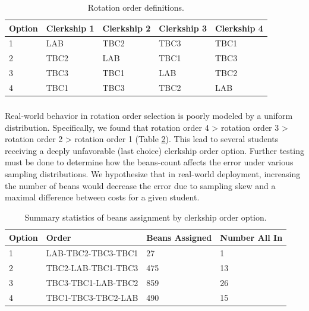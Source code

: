 \documentclass{article}
\begin{document}
\begin{table}[h]
\centering
\begin{tabular}{@{}lllll@{}}
\toprule
Option & Clerkship 1 & Clerkship 2 & Clerkship 3 & Clerkship 4 \\ \midrule
1      & LAB         & TBC2        & TBC3        & TBC1        \\
2      & TBC2        & LAB         & TBC1        & TBC3        \\
3      & TBC3        & TBC1        & LAB         & TBC2        \\
4      & TBC1        & TBC3        & TBC2        & LAB         \\ \bottomrule
\end{tabular}
\caption{Rotation order definitions.}
\label{tab:tab1}
\end{table}

\subsubsection{}
Real-world behavior in rotation order selection is poorly modeled by a uniform distribution. Specifically, we found that rotation order 4 > rotation order 3 > rotation order 2 > rotation order 1 (Table \ref{tab:tab2}). This lead to several students receiving a deeply unfavorable (last choice) clerkship order option. Further testing must be done to determine how the beans-count affects the error under various sampling distributions. We hypothesize that in real-world deployment, increasing the number of beans would decrease the error due to sampling skew and a maximal difference between costs for a given student. 

\begin{table}[h]
\centering
\begin{tabular}{@{}llll@{}}
\toprule
Option & Order              & Beans Assigned & Number All In \\ \midrule
1      & LAB-TBC2-TBC3-TBC1 & 27             & 1             \\
2      & TBC2-LAB-TBC1-TBC3 & 475            & 13            \\
3      & TBC3-TBC1-LAB-TBC2 & 859            & 26            \\
4      & TBC1-TBC3-TBC2-LAB & 490            & 15            \\ \bottomrule
\end{tabular}
\caption{Summary statistics of beans assignment by clerkship order option.}
\label{tab:tab2}
\end{table}
\end{document}
